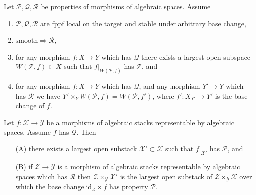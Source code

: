 \begin{lemma}
\label{lemma-local-source}
Let $\mathcal{P}, \mathcal{Q}, \mathcal{R}$ be properties of morphisms
of algebraic spaces. Assume
\begin{enumerate}
\item $\mathcal{P}, \mathcal{Q}, \mathcal{R}$ are fppf local on the target
and stable under arbitrary base change,
\item $\text{smooth} \Rightarrow \mathcal{R}$,
\item for any morphism $f : X \to Y$ which has $\mathcal{Q}$ there exists a
largest open subspace $W(\mathcal{P}, f) \subset X$ such that
$f|_{W(\mathcal{P}, f)}$ has $\mathcal{P}$, and
\item for any morphism $f : X \to Y$ which has $\mathcal{Q}$,
and any morphism $Y' \to Y$ which has $\mathcal{R}$ we have
$Y' \times_Y W(\mathcal{P}, f) = W(\mathcal{P}, f')$, where
$f' : X_{Y'} \to Y'$ is the base change of $f$.
\end{enumerate}
Let $f : \mathcal{X} \to \mathcal{Y}$ be a morphisms of algebraic stacks
representable by algebraic spaces. Assume $f$ has $\mathcal{Q}$. Then
\begin{enumerate}
\item[(A)] there exists a largest open substack
$\mathcal{X}' \subset \mathcal{X}$ such that $f|_{\mathcal{X}'}$ has
$\mathcal{P}$, and
\item[(B)] if $\mathcal{Z} \to \mathcal{Y}$ is a morphism of algebraic
stacks representable by algebraic spaces which has $\mathcal{R}$
then $\mathcal{Z} \times_\mathcal{Y} \mathcal{X}'$ is the largest open
substack of $\mathcal{Z} \times_\mathcal{Y} \mathcal{X}$ over which
the base change $\text{id}_\mathcal{Z} \times f$ has property $\mathcal{P}$.
\end{enumerate}
\end{lemma}

